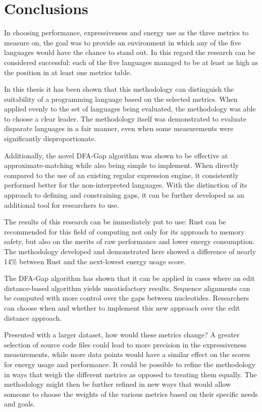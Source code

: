 \section{Conclusions}
\label{sec:conclusions}

In choosing performance, expressiveness and energy use as the three metrics to measure on, the goal was to provide an environment in which any of the five languages would have the chance to stand out. In this regard the research can be considered successful: each of the five languages managed to be at least as high as the  position in at least one metrics table.

In this thesis it has been shown that this methodology can distinguish the suitability of a programming language based on the selected metrics. When applied evenly to the set of languages being evaluated, the methodology was able to choose a clear leader. The methodology itself was demonstrated to evaluate disparate languages in a fair manner, even when some measurements were significantly disproportionate.

Additionally, the novel DFA-Gap algorithm was shown to be effective at approximate-matching while also being simple to implement. When directly compared to the use of an existing regular expression engine, it consistently performed better for the non-interpreted languages. With the distinction of its approach to defining and constraining gaps, it can be further developed as an additional tool for researchers to use.

The results of this research can be immediately put to use: Rust can be recommended for this field of computing not only for its approach to memory safety, but also on the merits of raw performance and lower energy consumption. The methodology developed and demonstrated here showed a difference of nearly 14\% between Rust and the next-lowest energy usage score.

The DFA-Gap algorithm has shown that it can be applied in cases where an edit distance-based algorithm yields unsatisfactory results. Sequence alignments can be computed with more control over the gaps between nucleotides. Researchers can choose when and whether to implement this new approach over the edit distance approach.

Presented with a larger dataset, how would these metrics change? A greater selection of source code files could lead to more precision in the expressiveness measurements, while more data points would have a similar effect on the scores for energy usage and performance. It could be possible to refine the methodology in ways that weigh the different metrics as opposed to treating them equally. The methodology might then be further refined in new ways that would allow someone to choose the weights of the various metrics based on their specific needs and goals.

